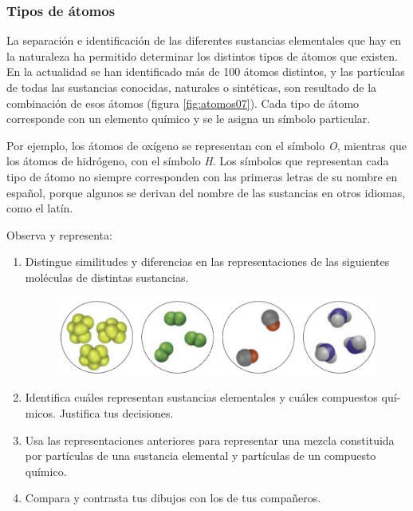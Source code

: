 \documentclass[11pt]{book}
\begin{document}
\subsubsection{Tipos de \'atomos}

La separación e identificación de las diferentes sustancias elementales que
hay en la naturaleza ha permitido determinar los distintos tipos de átomos
que existen. En la actualidad se han identificado más de 100 átomos
distintos, y las partículas de todas las sustancias conocidas, naturales o sintéticas,
son resultado de la combinación de esos átomos
(figura \ref{fig:atomos07}). Cada tipo de átomo corresponde con un elemento
químico y se le asigna un símbolo particular.

Por ejemplo, los
átomos de oxígeno se representan con el símbolo \emph{O}, mientras que
los átomos de hidrógeno, con el símbolo \emph{H}. Los símbolos que representan
cada tipo de átomo no siempre corresponden con las primeras letras
de su nombre en español, porque algunos se derivan del nombre de las sustancias
en otros idiomas, como el latín.\\

\begin{minipage}{\textwidth}
  \begin{boxK}
    Observa y representa:

    \begin{enumerate}
      \item Distingue similitudes y diferencias en las representaciones de las siguientes
            moléculas de distintas sustancias.

            \begin{figure}[H]
              \centering
              \includegraphics[width=.6\textwidth]{atomos05.png}
            \end{figure}

      \item Identifica cuáles representan sustancias elementales y cuáles compuestos quí-
            micos. Justifica tus decisiones.
      \item Usa las representaciones anteriores para representar una mezcla constituida por
            partículas de una sustancia elemental y partículas de un compuesto químico.
      \item Compara y contrasta tus dibujos con los de tus compañeros.
    \end{enumerate}
  \end{boxK}
\end{minipage}
\vspace{0.5cm}
\end{document}
